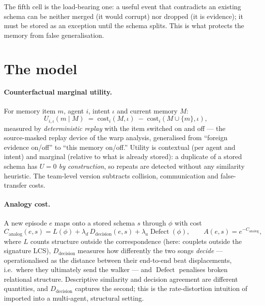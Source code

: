 \documentclass{article}
\begin{document}
The fifth cell is the load-bearing one: a useful event that
contradicts an existing schema can be neither merged (it would
corrupt) nor dropped (it is evidence); it must be stored as an
exception until the schema splits. This is what protects the memory
from false generalisation.

\section{The model}
\label{sec:model}

\paragraph{Counterfactual marginal utility.} For memory item $m$,
agent $i$, intent $\iota$ and current memory $M$:
\[
U_{i,\iota}(m \mid M) \;=\;
\mathrm{cost}_i(M, \iota) \;-\; \mathrm{cost}_i(M \cup \{m\}, \iota),
\]
measured by \emph{deterministic replay} with the item switched on and
off --- the source-masked replay device of the warp analysis,
generalised from ``foreign evidence on/off'' to ``this memory
on/off.'' Utility is contextual (per agent and intent) and marginal
(relative to what is already stored): a duplicate of a stored schema
has $U = 0$ \emph{by construction}, so repeats are detected without
any similarity heuristic. The team-level version subtracts collision,
communication and false-transfer costs.

\paragraph{Analogy cost.} A new episode $e$ maps onto a stored schema
$s$ through $\phi$ with cost
\[
C_{\mathrm{analog}}(e,s) = L(\phi) + \lambda_d\,
D_{\mathrm{decision}}(e,s) + \lambda_a \operatorname{Defect}(\phi),
\qquad A(e,s) = e^{-C_{\mathrm{analog}}},
\]
where $L$ counts structure outside the correspondence (here: couplets
outside the signature LCS), $D_{\mathrm{decision}}$ measures how
differently the two songs \emph{decide} --- operationalised as the
distance between their end-to-end beat displacements, i.e.\ where
they ultimately send the walker --- and $\operatorname{Defect}$
penalises broken relational structure. Descriptive similarity and
decision agreement are different quantities, and
$D_{\mathrm{decision}}$ captures the second; this is the
rate-distortion intuition of \citet{rdd2026} imported into a
multi-agent, structural setting.
\end{document}
